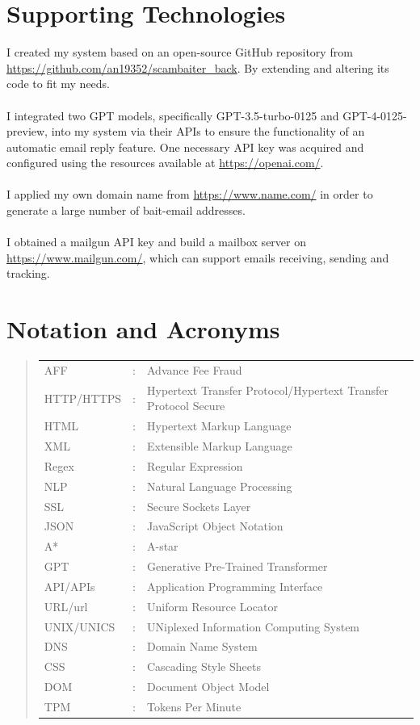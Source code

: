 \documentclass[ oneside,%
                    author={Cassie Qing Tang},
                    degree={BSc},
                     title={An Automated Response System for Disrupting Online Pet Scamming \\ },
                    subtitle={ }]{dissertation}
\begin{document}
\chapter*{Supporting Technologies}
I created my system based on an open-source GitHub repository from \url{https://github.com/an19352/scambaiter_back}. By extending and altering its code to fit my needs.
\\
\\
I integrated two GPT models, specifically GPT-3.5-turbo-0125 and GPT-4-0125-preview, into my system via their APIs to ensure the functionality of an automatic email reply feature. One necessary API key was acquired and configured using the resources available at \url{https://openai.com/}.
\\
\\
I applied my own domain name from \url{https://www.name.com/} in order to generate a large number of bait-email addresses.
\\
\\
I obtained a mailgun API key and build a mailbox server on \url{https://www.mailgun.com/}, which can support emails receiving, sending and tracking.

\chapter*{Notation and Acronyms}
\begin{quote}
\noindent
\begin{tabular}{lcl}
AFF                 &:     & Advance Fee Fraud    
 \\ 
HTTP/HTTPS          &:     & Hypertext Transfer Protocol/Hypertext Transfer Protocol Secure
 \\ 
HTML                &:     & Hypertext Markup Language
\\
XML                 &:     & Extensible Markup Language
\\
Regex               &:     & Regular Expression
\\
NLP                 &:     & Natural Language Processing
\\
SSL                 &:     & Secure Sockets Layer
\\
JSON                &:     & JavaScript Object Notation
\\
A*                  &:     & A-star
\\
GPT                 &:     & Generative Pre-Trained Transformer
\\
API/APIs            &:     & Application Programming Interface
\\
URL/url             &:     & Uniform Resource Locator
\\
UNIX/UNICS          &:     & UNiplexed Information Computing System
\\
DNS                 &:     & Domain Name System
\\
CSS                 &:     & Cascading Style Sheets
\\
DOM                 &:     & Document Object Model
\\
TPM                 &:     & Tokens Per Minute

\end{tabular}
\end{quote}
\end{document}
